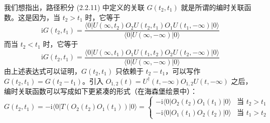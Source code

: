 我们想指出，路径积分 (2.2.11) 中定义的关联 $G(t_2,t_1)$ 就是所谓的编时关联函数。这是因为，当 $t_2>t_1$ 时，它等于
\begin{equation*}
\mathrm{i}G(t_2,t_1)=\frac{\langle 0|U(\infty,t_2)O_2U(t_2,t_1)O_1U(t_1,-\infty)|0\rangle}{\langle 0|U(\infty,-\infty)|0\rangle}
\end{equation*}
而当 $t_2<t_1$ 时，它等于
\begin{equation*}
\mathrm{i}G(t_2,t_1)=\frac{\langle 0|U(\infty,t_1)O_1U(t_1,t_2)O_2U(t_2,-\infty)|0\rangle}{\langle 0|U(\infty,-\infty)|0\rangle}
\end{equation*}
由上述表达式可以证明，$G(t_2,t_1)$ 只依赖于 $t_2-t_1$，可以写作 $G(t_2,t_1)=G(t_2-t_1)$。引入 $O_{1,2}(t)=U^\dagger(t,-\infty)O_{1,2}U(t,-\infty)$ 之后，编时关联函数可以写成如下更紧凑的形式（在海森堡绘景中）：
\begin{equation*}
G(t_2,t_1)=-\mathrm{i}\langle 0|T(O_2(t_2)O_1(t_1))|0\rangle=\left\{\begin{array}{ll}
-\mathrm{i}\langle 0|O_2(t_2)O_1(t_1)|0\rangle & \text{当 } t_2>t_1\\
-\mathrm{i}\langle 0|O_1(t_1)O_2(t_2)|0\rangle & \text{当 } t_1>t_2
\end{array}\right.\tag{2.2.12}
\end{equation*}


